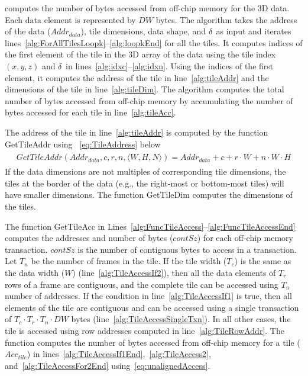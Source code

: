  computes the number of bytes accessed from off-chip memory for the 3D data. Each data element is represented by $DW$ bytes. The algorithm takes the address of the data ($Addr_{data}$), tile dimensions, data shape, and $\delta$ as input and iterates lines~\ref{alg:ForAllTilesLoopk}--\ref{alg:loopkEnd} for all the tiles. It computes indices of the first element of the tile in the 3D array of the data using the tile index $(x,y,z)$ and $\delta$ in lines~\ref{alg:idxc}--\ref{alg:idxn}. Using the indices of the first element, it computes the address of the tile in line~\ref{alg:tileAddr} and the dimensions of the tile in line~\ref{alg:tileDim}. The algorithm computes the total number of bytes accessed from off-chip memory by accumulating the number of bytes accessed for each tile in line~\ref{alg:tileAcc}. 

The address of the tile in line~\ref{alg:tileAddr} is computed by the function GetTileAddr using ~\eqref{eq:TileAddress} below
\begin{align}\label{eq:TileAddress}
	\begin{split}
		GetTileAddr(Addr_{data},c,r,n,\langle W,H,N\rangle){=}Addr_{data} + c + r\cdot W + n\cdot W\cdot H
	\end{split}
\end{align}
If the data dimensions are not multiples of corresponding tile dimensions, the tiles at the border of the data (e.g., the right-most or bottom-most tiles) will have smaller dimensions. The function GetTileDim computes the dimensions of the tiles.

The function GetTileAcc in Lines~\ref{alg:FuncTileAccess}--\ref{alg:FuncTileAccessEnd} computes the addresses and number of bytes ($contSz$) for each off-chip memory transaction. $contSz$ is the number of contiguous bytes to access in a transaction. Let $T_n$ be the number of frames in the tile. If the tile width ($T_c$) is the same as the data width ($W$) (line~\ref{alg:TileAccessIf2}), then all the data elements of $T_r$ rows of a frame are contiguous, and the complete tile can be accessed using $T_n$ number of addresses. If the condition in line~\ref{alg:TileAccessIf1} is true, then all elements of the tile are contiguous and can be accessed using a single transaction of $T_c\cdot T_r\cdot T_n\cdot DW$ bytes (line~\ref{alg:TileAccessSingleTxn}). In all other cases, the tile is accessed using row addresses computed in line~\ref{alg:TileRowAddr}. The function computes the number of bytes accessed from off-chip memory for a tile ($Acc_{tile}$) in lines~\ref{alg:TileAccessIf1End},~\ref{alg:TileAccess2}, and~\ref{alg:TileAccessFor2End} using~\eqref{eq:unalignedAccess}. 

